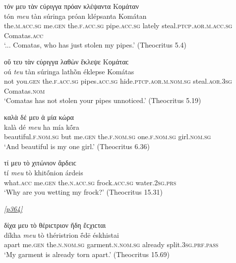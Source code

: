 \begin{exe}
\ex τόν μευ τὰν ϲύριγγα πρόαν κλέψαντα Κομάταν\\
\gll tón \emph{meu} tàn súringa próan klépsanta Komátan\\
the.\textsc{m.acc.sg} me.\textsc{gen} the.\textsc{f.acc.sg} pipe.\textsc{acc.sg} lately steal.\textsc{ptcp.aor.m.acc.sg} Comatas.\textsc{acc}\\
\trans `... Comatas, who has just stolen my pipes.' (Theocritus 5.4)
\label{gen21}
\end{exe}

\begin{exe}
\ex οὔ τευ τὰν ϲύριγγα λαθὼν ἔκλεψε Κομάταϲ\\
\gll oú \emph{teu} tàn súringa lathṑn éklepse Komátas\\
not you.\textsc{gen} the.\textsc{f.acc.sg} pipes.\textsc{acc.sg} hide.\textsc{ptcp.aor.m.nom.sg} steal.\textsc{aor.3sg} Comatas.\textsc{nom}\\
\trans `Comatas has not stolen your pipes unnoticed.' (Theocritus 5.19)
\label{gen22}
\end{exe}

\begin{exe}
\ex καλὰ δέ μευ ἁ μία κώρα\\
\gll kalà dé \emph{meu} ha mía kṓra\\
beautiful.\textsc{f.nom.sg} but me.\textsc{gen} the.\textsc{f.nom.sg}
one.\textsc{f.nom.sg} girl.\textsc{nom.sg}\\
\trans `And beautiful is my one girl.' (Theocritus 6.36)
\label{gen23}
\end{exe}

\begin{exe}
\ex τί μευ τὸ χιτώνιον ἄρδειϲ\\
\gll tí \emph{meu} tò khitṓnion árdeis\\
what.\textsc{acc} me.\textsc{gen} the.\textsc{n.acc.sg} frock.\textsc{acc.sg} water.\textsc{2sg.prs}\\
\trans `Why are you wetting my frock?' (Theocritus 15.31)
\label{gen24}
\end{exe}

\hyperlink{p364}{\emph{[p364]}}

\begin{exe}
\ex δίχα μευ τὸ θέριϲτριον ἤδη ἔϲχιϲται\\
\gll díkha \emph{meu} tò théristrion ḗdē éskhistai\\
apart me.\textsc{gen} the.\textsc{n.nom.sg} garment.\textsc{n.nom.sg} already split.\textsc{3sg.prf.pass}\\
\trans `My garment is already torn apart.' (Theocritus 15.69)
\label{gen25}
\end{exe}

